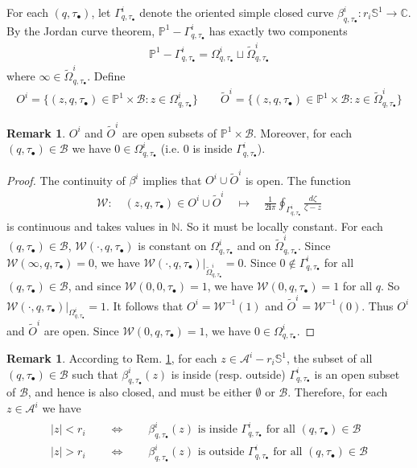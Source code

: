 \documentclass[11pt,b5paper,notitlepage]{article}
\theoremstyle{definition}
\newtheorem{rem}[df]{Remark}
\theoremstyle{plain}
\newcommand{\mc}{\mathcal}
\newcommand{\wtd}{\widetilde}
\newcommand{\Sbb}{\mathbb{S}}
\newcommand{\im}{\mathbf{i}}
\newcommand{\blt}{\bullet}
\newcommand{\Cbb}{\mathbb C}
\newcommand{\Nbb}{\mathbb N}
\newcommand{\Pbb}{\mathbb P}
\newcommand{\<}{\left\langle}
\renewcommand{\>}{\right\rangle}
\newcommand{\MB}{\mathcal{B}}
\numberwithin{equation}{subsection}
\begin{document}
For each $(q,\tau_\blt)$, let $\Gamma^i_{q,\tau_\blt}$ denote the oriented simple closed curve $\beta^i_{q,\tau_\blt}:r_i\Sbb^1\rightarrow\Cbb$. By the Jordan curve theorem, $\Pbb^1-\Gamma^i_{q,\tau_\blt}$ has exactly two components
\begin{align*}
\Pbb^1-\Gamma^i_{q,\tau_\blt}=\Omega^i_{q,\tau_\blt}\sqcup\wtd\Omega^i_{q,\tau_\blt}
\end{align*}
where $\infty\in\wtd\Omega^i_{q,\tau_\blt}$. Define
\begin{align}
O^i=\{(z,q,\tau_\blt)\in\Pbb^1\times\MB:z\in\Omega^i_{q,\tau_\blt}\}\qquad \wtd O^i=\{(z,q,\tau_\blt)\in\Pbb^1\times\MB:z\in\wtd\Omega^i_{q,\tau_\blt}\}
\end{align}

\begin{rem}\label{lbb29}
$O^i$ and $\wtd O^i$ are open subsets of $\Pbb^1\times\MB$. Moreover,  for each $(q,\tau_\blt)\in\MB$ we have $0\in\Omega_{q,\tau_\blt}^i$ (i.e. $0$ is inside $\Gamma^i_{q,\tau_\blt}$).
\end{rem}

\begin{proof}
The continuity of $\beta^i$ implies that $O^i\cup \wtd O^i$ is open. The function
\begin{align*}
\mc W:\quad (z,q,\tau_\blt)\in O^i\cup \wtd O^i\quad\mapsto\quad \frac 1{2\im\pi}\oint\nolimits_{\Gamma^i_{q,\tau_\blt}}\frac {d\zeta}{\zeta-z}
\end{align*}
is continuous and takes values in $\Nbb$. So it must be locally constant. For each $(q,\tau_\blt)\in\MB$, $\mc W(\cdot,q,\tau_\blt)$ is constant on $\Omega^i_{q,\tau_\blt}$ and on $\wtd\Omega^i_{q,\tau_\blt}$. Since $\mc W(\infty,q,\tau_\blt)=0$, we have $\mc W(\cdot,q,\tau_\blt)|_{\wtd\Omega^i_{q,\tau_\blt}}=0$. Since $0\notin\Gamma^i_{q,\tau_\blt}$ for all $(q,\tau_\blt)\in\MB$, and since $\mc W(0,0,\tau_\blt)=1$, we have $\mc W(0,q,\tau_\blt)=1$ for all $q$. So $\mc W(\cdot,q,\tau_\blt)|_{\Omega^i_{q,\tau_\blt}}=1$. It follows that $O^i=\mc W^{-1}(1)$ and $\wtd O^i=\mc W^{-1}(0)$. Thus $O^i$ and $\wtd O^i$ are open. Since $\mc W(0,q,\tau_\blt)=1$, we have $0\in\Omega_{q,\tau_\blt}^i$.
\end{proof}

\begin{rem}
According to Rem. \ref{lbb29}, for each $z\in\mc A^i-r_i\Sbb^1$, the subset of all $(q,\tau_\blt)\in\MB$ such that $\beta^i_{q,\tau_\blt}(z)$ is inside (resp. outside) $\Gamma^i_{q,\tau_\blt}$ is an open subset of $\MB$, and hence is also closed, and must be either $\emptyset$ or $\MB$. Therefore, for each $z\in\mc A^i$ we have
\begin{gather}\label{eqb61}
\begin{gathered}
|z|<r_i\qquad\Longleftrightarrow\qquad \beta^i_{q,\tau_\blt}(z)\text{ is inside $\Gamma^i_{q,\tau_\blt}$ for all }(q,\tau_\blt)\in\MB\\
|z|>r_i\qquad\Longleftrightarrow\qquad \beta^i_{q,\tau_\blt}(z)\text{ is outside $\Gamma^i_{q,\tau_\blt}$ for all }(q,\tau_\blt)\in\MB
\end{gathered}
\end{gather}
\end{rem}
\end{document}
